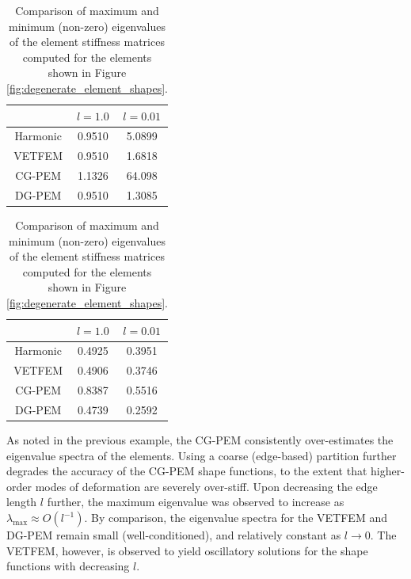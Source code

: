 \begin{table}
\centering
\begin{subtable}{.5\textwidth}
\centering
\begin{tabular}{| c || c | c |}
    \hline
             & $l=1.0$ & $l=0.01$ \\ \hline \hline
    Harmonic & 0.9510 & 5.0899 \\ \hline
    VETFEM   & 0.9510 & 1.6818 \\ \hline
    CG-PEM   & 1.1326 & 64.098 \\ \hline
    DG-PEM   & 0.9510 & 1.3085 \\
    \hline
    \end{tabular}
    \caption{Largest eigenvalue: $\lambda_{\max}$}
    \label{tab:degenerate_stiffness_max_eigenvalue}
\end{subtable}%
\begin{subtable}{.5\textwidth}
\centering
\begin{tabular}{| c || c | c |}
    \hline
             & $l=1.0$ & $l=0.01$ \\ \hline \hline
    Harmonic & 0.4925 & 0.3951 \\ \hline
    VETFEM   & 0.4906 & 0.3746 \\ \hline
    CG-PEM   & 0.8387 & 0.5516 \\ \hline
    DG-PEM   & 0.4739 & 0.2592 \\
    \hline
    \end{tabular}
    \caption{Smallest (non-zero) eigenvalue: $\lambda_{\min}$}
    \label{tab:degenerate_stiffness_min_eigenvalue}
\end{subtable}

\caption{Comparison of maximum and minimum (non-zero) eigenvalues of the element stiffness matrices computed for the elements shown in Figure \ref{fig:degenerate_element_shapes}.}
\label{tab:degenerate_stiffness_max_min_eigenvalue}
\end{table}

As noted in the previous example, the CG-PEM consistently over-estimates the eigenvalue spectra of the elements. Using a coarse (edge-based) partition further degrades the accuracy of the CG-PEM shape functions, to the extent that higher-order modes of deformation are severely over-stiff. Upon decreasing the edge length $l$ further, the maximum eigenvalue was observed to increase as $\lambda_{\max} \approx O (l^{-1})$. By comparison, the eigenvalue spectra for the VETFEM and DG-PEM remain small (well-conditioned), and relatively constant as $l \rightarrow 0$. The VETFEM, however, is observed to yield oscillatory solutions for the shape functions with decreasing $l$.

